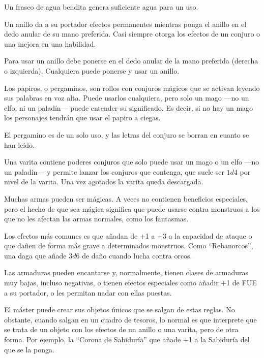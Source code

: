 \begin{multicols}{2}
Un frasco de agua bendita genera suficiente agua para un uso.


Un anillo da a su portador efectos permanentes mientras ponga el anillo en el
dedo anular de su mano preferida. Casi siempre otorga los efectos de un conjuro
o una mejora en una habilidad.

Para usar un anillo debe ponerse en el dedo anular de la mano preferida (derecha
o izquierda). Cualquiera puede ponerse y usar un anillo.


Los papiros, o pergaminos, son rollos con conjuros mágicos que se activan leyendo
sus palabras en voz alta. Puede usarlos cualquiera,
pero solo un mago ---no un elfo, ni un paladín--- puede entender su significado. Es
decir, si no hay un mago los personajes tendrán que usar el papiro a ciegas.

El pergamino es de un solo uso, y las letras del conjuro se borran en cuanto se han leído.


Una varita contiene poderes conjuros que solo puede usar un mago o un elfo ---no un paladín---
y permite lanzar los conjuros que contenga, que suele ser $ 1d4$ por nivel de la varita. Una vez
agotados la varita queda descargada.


Muchas armas pueden ser mágicas. A veces no contienen beneficios especiales, pero el hecho
de que sea mágica significa que puede usarse contra monstruos a los que no les afectan las
armas normales, como los fantasmas.

Los efectos más comunes es que añadan de +1 a +3 a la capacidad de ataque o que dañen de
forma más grave a determinados monstruos. Como \enquote{Rebanorcos}, una daga que añade $ 3d6$ de daño cuando lucha contra orcos.


Las armaduras pueden encantarse y, normalmente, tienen clases de armaduras muy bajas,
incluso negativas, o tienen efectos especiales como añadir +1 de FUE a su portador, o
les permitan nadar con ellas puestas.


El máster puede crear sus objetos únicos que se salgan de estas reglas. No obstante,
cuando salgan en un cuadro de tesoros, lo normal es que interprete que se trata de un
objeto con los efectos de un anillo o una varita, pero de otra forma. Por ejemplo, la
\enquote{Corona de Sabiduría} que añade +1 a la Sabiduría del que se la ponga.


\end{multicols}
